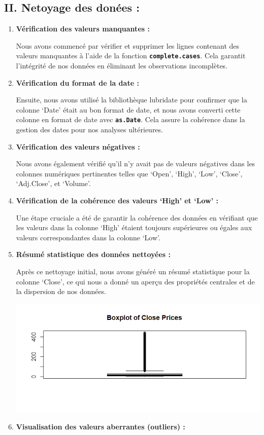 \documentclass[
  letterpaper,
  DIV=11,
  numbers=noendperiod]{scrartcl}
\begin{document}
\hypertarget{ii.-netoyage-des-donuxe9es}{%
\subsection{II. Netoyage des donées
:}\label{ii.-netoyage-des-donuxe9es}}

\begin{enumerate}
\def\labelenumi{\arabic{enumi}.}
\item
  \textbf{Vérification des valeurs manquantes :}

  Nous avons commencé par vérifier et supprimer les lignes contenant des
  valeurs manquantes à l'aide de la fonction
  \textbf{\texttt{complete.cases}}. Cela garantit l'intégrité de nos
  données en éliminant les observations incomplètes.
\item
  \textbf{Vérification du format de la date :}

  Ensuite, nous avons utilisé la bibliothèque lubridate pour confirmer
  que la colonne `Date' était au bon format de date, et nous avons
  converti cette colonne en format de date avec
  \textbf{\texttt{as.Date}}. Cela assure la cohérence dans la gestion
  des dates pour nos analyses ultérieures.
\item
  \textbf{Vérification des valeurs négatives :}

  Nous avons également vérifié qu'il n'y avait pas de valeurs négatives
  dans les colonnes numériques pertinentes telles que `Open', `High',
  `Low', `Close', `Adj.Close', et `Volume'.
\item
  \textbf{Vérification de la cohérence des valeurs `High' et `Low' :}

  Une étape cruciale a été de garantir la cohérence des données en
  vérifiant que les valeurs dans la colonne `High' étaient toujours
  supérieures ou égales aux valeurs correspondantes dans la colonne
  `Low'.
\item
  \textbf{Résumé statistique des données nettoyées :}

  Après ce nettoyage initial, nous avons généré un résumé statistique
  pour la colonne `Close', ce qui nous a donné un aperçu des propriétés
  centrales et de la dispersion de nos données.

  \includegraphics{images/boxplotClosePrices.png}
\item
  \textbf{Visualisation des valeurs aberrantes (outliers) :}


\end{enumerate}
\end{document}
